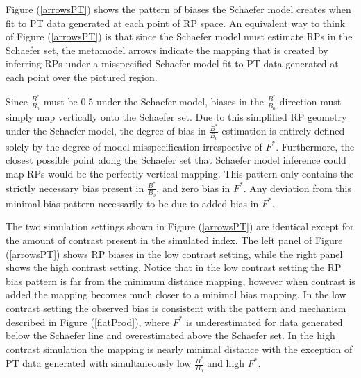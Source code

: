\documentclass[12pt]{article}
\begin{document}
%
Figure (\ref{arrowsPT}) shows the pattern of biases the Schaefer model creates when fit 
to PT data generated at each point of RP space. An equivalent way to think of Figure 
(\ref{arrowsPT}) is that since the Schaefer model must estimate RPs in the Schaefer set, 
the metamodel arrows indicate the mapping that is created by inferring RPs under 
a misspecified Schaefer model fit to PT data generated at each point over the pictured 
region.

%
Since $\frac{B^*}{B_0}$ must be 0.5 under the Schaefer model, biases in the 
$\frac{B^*}{B_0}$ direction must simply map vertically onto the Schaefer set.
Due to this simplified RP geometry under the Schaefer model, the degree of bias in 
$\frac{B^*}{B_0}$ estimation is entirely defined solely by the degree of model 
misspecification irrespective of $F^*$. Furthermore, 
the closest possible point along the Schaefer set that Schaefer model inference %
could map RPs would be the perfectly vertical mapping. This pattern only contains the 
strictly necessary bias present in $\frac{B^*}{B_0}$, and zero bias in $F^*$. 
Any deviation from this minimal bias pattern necessarily to be due to added bias in $F^*$.

%
The two simulation settings shown in Figure (\ref{arrowsPT}) are identical except 
for the amount of contrast present in the simulated index. The left panel of 
Figure (\ref{arrowsPT}) shows RP biases in the low contrast setting, while the 
right panel shows the high contrast setting. Notice that in the low contrast 
setting the RP bias pattern is far from the minimum distance mapping, however when 
contrast is added the mapping becomes much closer to a minimal bias mapping. 
In the low contrast setting the observed bias is consistent with the pattern 
and mechanism described in Figure (\ref{flatProd}), where $F^*$ is underestimated 
for data generated below the Schaefer line and overestimated above the Schaefer set.
In the high contrast simulation the mapping is nearly minimal distance with the exception 
of PT data generated with simultaneously low $\frac{B^*}{B_0}$ and high $F^*$. 
\end{document}
